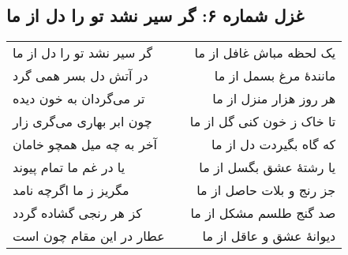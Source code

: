 \begin{center}
\section*{غزل شماره ۶: گر سیر نشد تو را دل از ما}
\label{sec:006}
\begin{longtable}{l p{0.5cm} r}
گر سیر نشد تو را دل از ما
&&
یک لحظه مباش غافل از ما
\\
در آتش دل بسر همی گرد
&&
مانندهٔ مرغ بسمل از ما
\\
تر می‌گردان به خون دیده
&&
هر روز هزار منزل از ما
\\
چون ابر بهاری می‌گری زار
&&
تا خاک ز خون کنی گل از ما
\\
آخر به چه میل همچو خامان
&&
که گاه بگیردت دل از ما
\\
یا در غم ما تمام پیوند
&&
یا رشتهٔ عشق بگسل از ما
\\
مگریز ز ما اگرچه نامد
&&
جز رنج و بلات حاصل از ما
\\
کز هر رنجی گشاده گردد
&&
صد گنج طلسم مشکل از ما
\\
عطار در این مقام چون است
&&
دیوانهٔ عشق و عاقل از ما
\\
\end{longtable}
\end{center}
